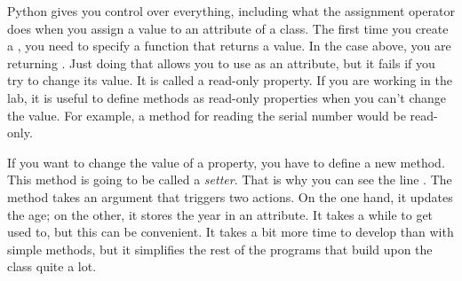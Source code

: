 Python gives you control over everything, including what the assignment operator \py{=} does when you assign a value to an attribute of a class. The first time you create a , you need to specify a function that returns a value. In the case above, you are returning . Just doing that allows you to use  as an attribute, but it fails if you try to change its value. It is called a read-only property. If you are working in the lab, it is useful to define methods as read-only properties when you can't change the value. For example, a method for reading the serial number would be read-only.

If you want to change the value of a property, you have to define a new method. This method is going to be called a \textit{setter}. That is why you can see the line . The method takes an argument that triggers two actions. On the one hand, it updates the age; on the other, it stores the year in an attribute. It takes a while to get used to, but this can be convenient. It takes a bit more time to develop than with simple methods, but it simplifies the rest of the programs that build upon the class quite a lot.
